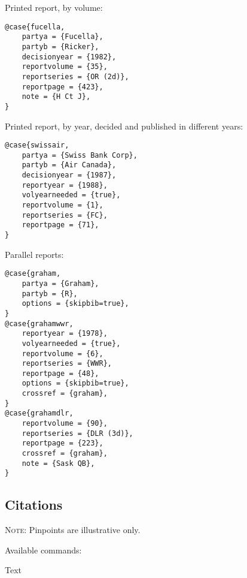 Printed report, by volume: \par\bigskip
\begin{verbatim}
@case{fucella,
	partya = {Fucella},
	partyb = {Ricker},
	decisionyear = {1982},
	reportvolume = {35},
	reportseries = {OR (2d)},
	reportpage = {423},
	note = {H Ct J},
}
\end{verbatim}

Printed report, by year, decided and published in different years: \par\bigskip
{}
\begin{verbatim}
@case{swissair,
	partya = {Swiss Bank Corp},
	partyb = {Air Canada},
	decisionyear = {1987},
	reportyear = {1988},
	volyearneeded = {true},
	reportvolume = {1},
	reportseries = {FC},
	reportpage = {71},
}
\end{verbatim}
\newpage
Parallel reports: \par\bigskip
\begin{verbatim}
@case{graham,
	partya = {Graham},
	partyb = {R},
	options = {skipbib=true},
}
@case{grahamwwr,
	reportyear = {1978},
	volyearneeded = {true},
	reportvolume = {6},
	reportseries = {WWR},
	reportpage = {48},
	options = {skipbib=true},
	crossref = {graham},
}
@case{grahamdlr,
	reportvolume = {90},
	reportseries = {DLR (3d)},
	reportpage = {223},
	crossref = {graham},
	note = {Sask QB},
}
\end{verbatim}

\newpage
\subsection{Citations}
{\footnotesize\textsc{Note}: Pinpoints are illustrative only.}
\bigskip
\bigskip


Available commands:

\numeg
{}
\smallskip
{}

Text\lawcite[\protect\label{fcoleb}][]{cole}
\bigskip
\bigskip

\numeg
{}
\smallskip
{}

